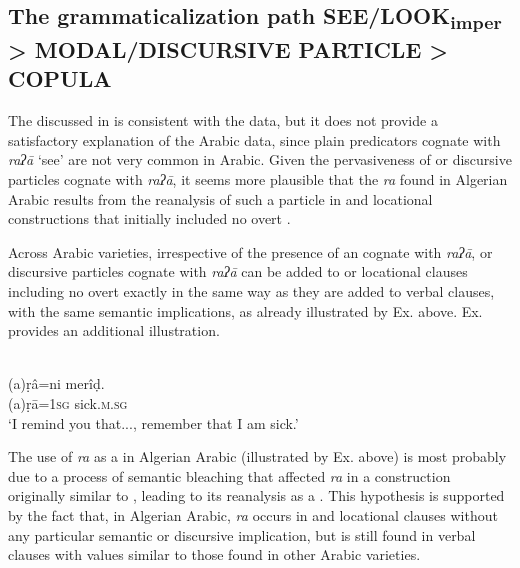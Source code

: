 \documentclass[output=paper]{langsci/langscibook}
\begin{document}
\subsection{The grammaticalization path SEE\slash LOOK\textsubscript{imper} > MODAL\slash DISCURSIVE PARTICLE > COPULA}\label{sec:creissels:6.2} 

The  discussed in  is consistent with the  data, but it does not provide a satisfactory explanation of the Arabic data, since plain  predicators cognate with \textit{raʔā} ‘see’ are not very common in Arabic. Given the pervasiveness of  or discursive particles cognate with \textit{raʔā}, it seems more plausible that the  \textit{ra} found in Algerian Arabic results from the reanalysis of such a particle in  and locational constructions that initially included no overt .

  Across Arabic varieties, irrespective of the presence of an   cognate with \textit{raʔā},  or discursive particles cognate with \textit{raʔā} can be added to  or locational clauses including no overt  exactly in the same way as they are added to verbal clauses, with the same semantic implications, as already illustrated by Ex.  above. Ex.  provides an additional illustration.
  
\ea%
    \label{ex:creissels:15}
     \\
   \gll \textrm{(}a\textrm{)}ṛâ=ni merîḍ.\\
   {(a)ṛā}=\textsc{1sg}  sick\textsc{.m.sg}\\
  \glt ‘I remind you that..., remember that I am sick.’\\ 
\z

The use of \textit{ra} as a  in Algerian Arabic (illustrated by Ex.  above) is most probably due to a process of semantic bleaching that affected \textit{ra} in a construction originally similar to , leading to its reanalysis as a . This hypothesis is supported by the fact that, in Algerian Arabic, \textit{ra} occurs in  and locational clauses without any particular semantic or discursive implication, but is still found in verbal clauses with values similar to those found in other Arabic varieties.
\end{document}
